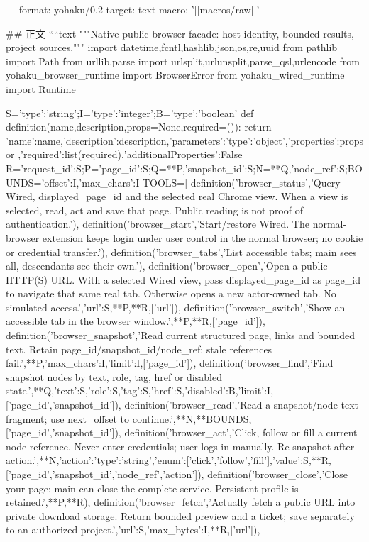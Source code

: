 ---
format: yohaku/0.2
target: text
macro: '[[macros/raw]]'
---

## 正文
````text
"""Native public browser facade: host identity, bounded results, project sources."""
import datetime,fcntl,hashlib,json,os,re,uuid
from pathlib import Path
from urllib.parse import urlsplit,urlunsplit,parse_qsl,urlencode
from yohaku_browser_runtime import BrowserError
from yohaku_wired_runtime import Runtime

S={'type':'string'};I={'type':'integer'};B={'type':'boolean'}
def definition(name,description,props=None,required=()):
 return {'name':name,'description':description,'parameters':{'type':'object','properties':props or {},'required':list(required),'additionalProperties':False}}
R={'request_id':S};P={'page_id':S};Q={**P,'snapshot_id':S};N={**Q,'node_ref':S};BOUNDS={'offset':I,'max_chars':I}
TOOLS=[
 definition('browser_status','Query Wired, displayed_page_id and the selected real Chrome view. When a view is selected, read, act and save that page. Public reading is not proof of authentication.'),
 definition('browser_start','Start/restore Wired. The normal-browser extension keeps login under user control in the normal browser; no cookie or credential transfer.'),
 definition('browser_tabs','List accessible tabs; main sees all, descendants see their own.'),
 definition('browser_open','Open a public HTTP(S) URL. With a selected Wired view, pass displayed_page_id as page_id to navigate that same real tab. Otherwise opens a new actor-owned tab. No simulated access.',{'url':S,**P,**R},['url']),
 definition('browser_switch','Show an accessible tab in the browser window.',{**P,**R},['page_id']),
 definition('browser_snapshot','Read current structured page, links and bounded text. Retain page_id/snapshot_id/node_ref; stale references fail.',{**P,'max_chars':I,'limit':I},['page_id']),
 definition('browser_find','Find snapshot nodes by text, role, tag, href or disabled state.',{**Q,'text':S,'role':S,'tag':S,'href':S,'disabled':B,'limit':I},['page_id','snapshot_id']),
 definition('browser_read','Read a snapshot/node text fragment; use next_offset to continue.',{**N,**BOUNDS},['page_id','snapshot_id']),
 definition('browser_act','Click, follow or fill a current node reference. Never enter credentials; user logs in manually. Re-snapshot after action.',{**N,'action':{'type':'string','enum':['click','follow','fill']},'value':S,**R},['page_id','snapshot_id','node_ref','action']),
 definition('browser_close','Close your page; main can close the complete service. Persistent profile is retained.',{**P,**R}),
 definition('browser_fetch','Actually fetch a public URL into private download storage. Return bounded preview and a ticket; save separately to an authorized project.',{'url':S,'max_bytes':I,**R},['url']),
